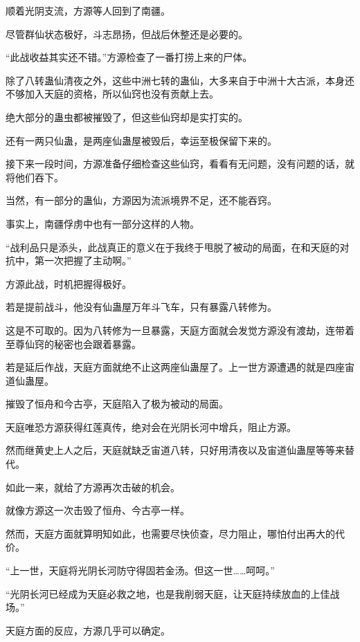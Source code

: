 
\begin{this_body}



顺着光阴支流，方源等人回到了南疆。

尽管群仙状态极好，斗志昂扬，但战后休整还是必要的。

“此战收益其实还不错。”方源检查了一番打捞上来的尸体。

除了八转蛊仙清夜之外，这些中洲七转的蛊仙，大多来自于中洲十大古派，本身还不够加入天庭的资格，所以仙窍也没有贡献上去。

绝大部分的蛊虫都被摧毁了，但这些仙窍却是实打实的。

还有一两只仙蛊，是两座仙蛊屋被毁后，幸运至极保留下来的。

接下来一段时间，方源准备仔细检查这些仙窍，看看有无问题，没有问题的话，就将他们吞下。

当然，有一部分的蛊仙，方源因为流派境界不足，还不能吞窍。

事实上，南疆俘虏中也有一部分这样的人物。

“战利品只是添头，此战真正的意义在于我终于甩脱了被动的局面，在和天庭的对抗中，第一次把握了主动啊。”

方源此战，时机把握得极好。

若是提前战斗，他没有仙蛊屋万年斗飞车，只有暴露八转修为。

这是不可取的。因为八转修为一旦暴露，天庭方面就会发觉方源没有渡劫，连带着至尊仙窍的秘密也会跟着暴露。

若是延后作战，天庭方面就绝不止这两座仙蛊屋了。上一世方源遭遇的就是四座宙道仙蛊屋。

摧毁了恒舟和今古亭，天庭陷入了极为被动的局面。

天庭唯恐方源获得红莲真传，绝对会在光阴长河中增兵，阻止方源。

然而继黄史上人之后，天庭就缺乏宙道八转，只好用清夜以及宙道仙蛊屋等等来替代。

如此一来，就给了方源再次击破的机会。

就像方源这一次击毁了恒舟、今古亭一样。

然而，天庭方面就算明知如此，也需要尽快侦查，尽力阻止，哪怕付出再大的代价。

“上一世，天庭将光阴长河防守得固若金汤。但这一世……呵呵。”

“光阴长河已经成为天庭必救之地，也是我削弱天庭，让天庭持续放血的上佳战场。”

天庭方面的反应，方源几乎可以确定。


\end{this_body}
